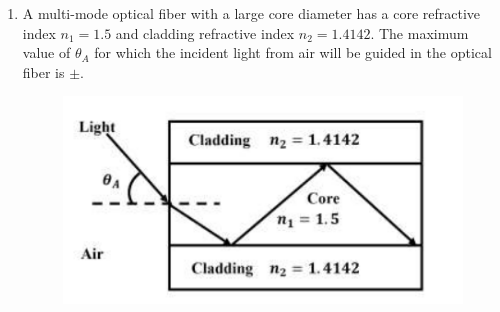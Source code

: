 \documentclass[journal,12pt,onecolumn]{IEEEtran}
\theoremstyle{remark}
\begin{document}
\begin{enumerate}
    \hfill{}

    \item A multi-mode optical fiber with a large core diameter has a core refractive index $n_1 = 1.5$ and cladding refractive index $n_2 = 1.4142$. The maximum value of $\theta_A$  for which the incident light from air will be guided in the optical fiber is $\pm$\underline{\hspace{2cm}}.
    \begin{figure}[H]
        \centering
        \includegraphics[width=0.7\columnwidth]{q55.png}
        \caption*{}
        \label{fig:q55}
    \end{figure}
    
    \hfill{}

\end{enumerate}
\end{document}
